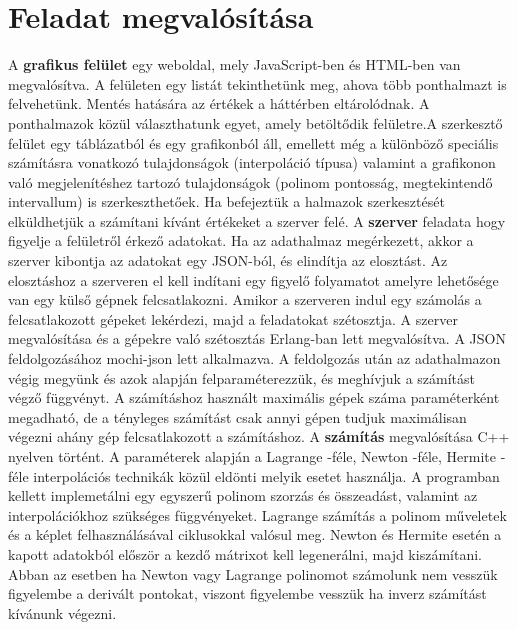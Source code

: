 \documentclass{elteikthesis}
\begin{document}
\section{Feladat megvalósítása}
A \textbf{grafikus felület}  egy weboldal, mely JavaScript-ben és HTML-ben van megvalósítva.
 A felületen egy listát tekinthetünk meg, ahova több ponthalmazt is felvehetünk. \newline  Mentés hatására az értékek a háttérben eltárolódnak. A ponthalmazok közül választhatunk egyet, amely betöltődik felületre.\newline A szerkesztő felület egy táblázatból és egy grafikonból áll, emellett még a különböző speciális számításra vonatkozó tulajdonságok (interpoláció típusa) valamint a grafikonon való megjelenítéshez tartozó tulajdonságok (polinom pontosság, megtekintendő intervallum) is szerkeszthetőek. \newline Ha befejeztük a halmazok szerkesztését elküldhetjük a számítani kívánt értékeket a szerver felé.
 \newline\newline
A \textbf{szerver} feladata hogy figyelje a felületről érkező adatokat. Ha az adathalmaz megérkezett, akkor a szerver kibontja az adatokat egy JSON-ból, és elindítja az elosztást. \newline
Az elosztáshoz a szerveren el kell indítani egy figyelő folyamatot amelyre lehetősége van egy külső gépnek felcsatlakozni. Amikor a szerveren indul egy számolás a felcsatlakozott gépeket lekérdezi, majd a feladatokat szétosztja.\newline
A szerver megvalósítása és a gépekre való szétosztás Erlang-ban lett megvalósítva. A JSON feldolgozásához mochi-json lett alkalmazva. A feldolgozás után az adathalmazon végig megyünk és azok alapján felparaméterezzük, és meghívjuk a számítást végző függvényt.\newline
A számításhoz használt maximális gépek száma paraméterként megadható, de a tényleges számítást csak annyi gépen tudjuk maximálisan végezni ahány gép felcsatlakozott a számításhoz.
\newline\newline
A \textbf{számítás} megvalósítása C++ nyelven történt. A paraméterek alapján a Lagrange -féle, Newton -féle, Hermite -féle interpolációs technikák közül eldönti melyik esetet használja.\newline
A programban kellett implemetálni egy egyszerű polinom szorzás és összeadást, valamint az interpolációkhoz szükséges függvényeket. Lagrange számítás a polinom műveletek és a képlet felhasználásával ciklusokkal valósul meg. Newton és Hermite esetén a kapott adatokból először a kezdő mátrixot kell legenerálni, majd kiszámítani. \newline
Abban az esetben ha Newton vagy Lagrange polinomot számolunk nem vesszük figyelembe a derivált pontokat, viszont figyelembe vesszük ha inverz számítást kívánunk végezni. 
\end{document}
